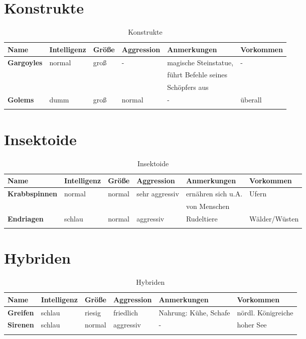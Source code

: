 \section{Konstrukte}
\begin{longtable}{|l|l|l|l|l|l|}
\hline
\textbf{Name} & \textbf{Intelligenz} & \textbf{Größe} & \textbf{Aggression} & \textbf{Anmerkungen} & \textbf{Vorkommen} \\ \hline

\textbf{Gargoyles} & normal & groß & - & magische Steinstatue, & - \\
& & & & führt Befehle seines & \\
& & & & Schöpfers aus & \\ \hline
\textbf{Golems} & dumm & groß & normal & - & überall \\ \hline

\caption{Konstrukte}
\label{tab:Konstrukte}
\end{longtable}


\section{Insektoide}
\begin{longtable}{|l|l|l|l|l|l|}
\hline
\textbf{Name} & \textbf{Intelligenz} & \textbf{Größe} & \textbf{Aggression} & \textbf{Anmerkungen} & \textbf{Vorkommen} \\ \hline

\textbf{Krabbspinnen} & normal & normal & sehr aggressiv & ernähren sich u.A. & Ufern \\ 
& & & & von Menschen & \\ \hline
\textbf{Endriagen} & schlau & normal & aggressiv & Rudeltiere & Wälder/Wüsten \\ \hline

\caption{Insektoide}
\label{tab:Insektoide}
\end{longtable}


\section{Hybriden}
\begin{longtable}{|l|l|l|l|l|l|}
\hline
\textbf{Name} & \textbf{Intelligenz} & \textbf{Größe} & \textbf{Aggression} & \textbf{Anmerkungen} & \textbf{Vorkommen} \\ \hline

\textbf{Greifen} & schlau & riesig & friedlich & Nahrung: Kühe, Schafe & nördl. Königreiche \\ \hline
\textbf{Sirenen} & schlau & normal & aggressiv & - & hoher See \\ \hline

\caption{Hybriden}
\label{tab:Hybriden}
\end{longtable}


